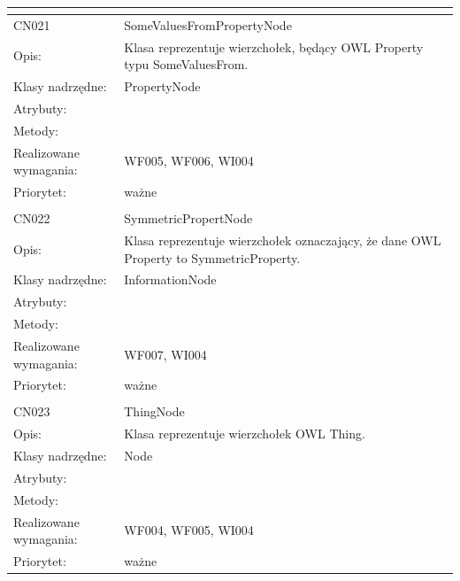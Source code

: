 \documentclass[a4paper,10pt]{article}
\begin{document}
\begin{center}
\begin{longtable}{|m{3cm}|m{9cm}|}
\multicolumn{2}{c}{} \\
 \hline

CN021 & SomeValuesFromPropertyNode \\ \hline
Opis: & Klasa reprezentuje wierzchołek, będący OWL Property typu SomeValuesFrom. \\ \hline
Klasy nadrzędne: & PropertyNode \\ \hline
Atrybuty: & %
 \\ \hline
Metody: & %
  \\ \hline
Realizowane wymagania: & WF005, WF006, WI004 \\ \hline
Priorytet: & ważne  \\ \hline

\multicolumn{2}{c}{} \\
 \hline

CN022 & SymmetricPropertNode \\ \hline
Opis: & Klasa reprezentuje wierzchołek oznaczający, że dane OWL Property to SymmetricProperty.    \\ \hline
Klasy nadrzędne: & InformationNode     \\ \hline
Atrybuty: & %
 \\ \hline
Metody: & %
  \\ \hline
Realizowane wymagania: & WF007, WI004 \\ \hline
Priorytet: & ważne  \\ \hline

\multicolumn{2}{c}{} \\
 \hline

CN023 & ThingNode \\ \hline
Opis: & Klasa reprezentuje wierzchołek OWL Thing.    \\ \hline
Klasy nadrzędne: & Node     \\ \hline
Atrybuty: & %
 \\ \hline
Metody: & %
  \\ \hline
Realizowane wymagania: & WF004, WF005, WI004 \\ \hline
Priorytet: & ważne  \\ \hline


\end{longtable}
\end{center}
\end{document}
